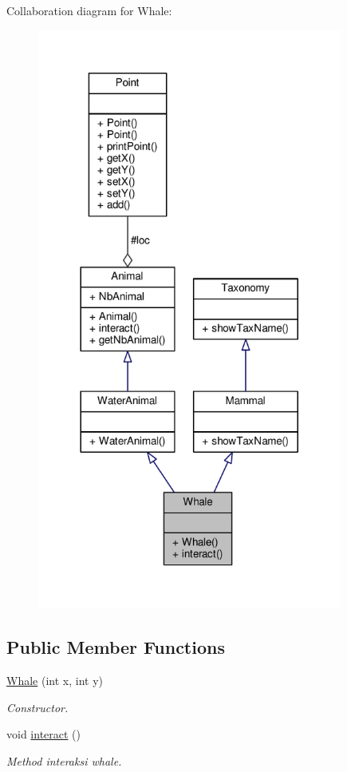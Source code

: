 Collaboration diagram for Whale\+:
\nopagebreak
\begin{figure}[H]
\begin{center}
\leavevmode
\includegraphics[width=284pt]{classWhale__coll__graph}
\end{center}
\end{figure}
\subsection*{Public Member Functions}
\begin{DoxyCompactItemize}
\item 
\hyperlink{classWhale_a87fe766bf3784ea90bf23cc86e10c488}{Whale} (int x, int y)
\begin{DoxyCompactList}\small\item\em Constructor. \end{DoxyCompactList}\item 
void \hyperlink{classWhale_a4c8a19ea11861b215901cf6e8863f841}{interact} ()\hypertarget{classWhale_a4c8a19ea11861b215901cf6e8863f841}{}\label{classWhale_a4c8a19ea11861b215901cf6e8863f841}

\begin{DoxyCompactList}\small\item\em Method interaksi whale. \end{DoxyCompactList}\end{DoxyCompactItemize}
